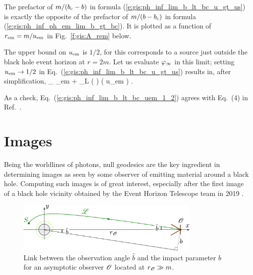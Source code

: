 \begin{remark} \label{r:gis:prefactor_b_bc}
The prefactor of $m/(b_{\rm c} - b)$ in
formula (\ref{e:gis:ph_inf_lim_b_lt_bc_u_gt_us}) is exactly the
opposite of the prefactor of $m/(b - b_{\rm c})$ in formula (\ref{e:gis:ph_inf_ph_em_lim_b_gt_bc}).
It is plotted as a function of $r_{\rm em} = m/u_{\rm em}$ in Fig.~\ref{f:gis:A_rem} below.
\end{remark}

The upper bound on $u_{\rm em}$ is $1/2$, for this corresponds to a source
just outside the black hole event horizon at $r=2m$. Let us evaluate
$\varphi_\infty$ in this limit; setting $u_{\rm em}\to 1/2$ in Eq.~(\ref{e:gis:ph_inf_lim_b_lt_bc_u_gt_us}) results in, after simplification,
\be  \label{e:gis:ph_inf_lim_b_lt_bc_uem_1_2}
   \ph_\infty  {} \ph_{\rm em}
    + \eps_L  \ln\left(  \right)
    \qquad \left( u_{\rm em} \to {} \right) .
\ee

\begin{remark}
As a check, Eq.~(\ref{e:gis:ph_inf_lim_b_lt_bc_uem_1_2}) agrees with
Eq.~(4) in Ref.~\cite{GrallHW19}.
\end{remark}



\section{Images} \label{s:gis:images}

Being the worldlines of photons, null geodesics are the key ingredient
in determining images as seen by some observer of emitting material around
a black hole. Computing such images is of great interest, especially after
the first image of a black hole vicinity obtained by
the Event Horizon Telescope team in 2019 \cite{EHT19a,Cardo19}.

\begin{figure}
\centerline{\includegraphics[width=0.8\textwidth]{gis_obs_angle.pdf}}
\caption[]{\label{f:gis:obs_angle} \footnotesize
Link between the observation angle $\hat{b}$ and the impact parameter $b$
for an asymptotic observer $\mathscr{O}$ located at $r_{\mathscr{O}} \gg m$.}
\end{figure}


